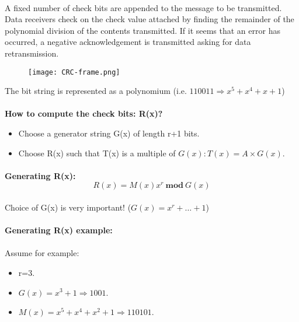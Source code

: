 \documentclass[../resumosRCOM.tex]{subfiles}
\begin{document}
\paragraph{}
A fixed number of check bits are appended to the message to be transmitted. 
Data receivers check on the check value attached by finding the remainder of the 
polynomial division of the contents transmitted. If it seems that an error has 
occurred, a negative acknowledgement is transmitted asking for data retransmission.

\begin{figure}[H]
    \centering
    \texttt{[image: CRC-frame.png]}
\end{figure}

The bit string is represented as a polynomium (i.e. $110011 \Rightarrow x^5+x^4+x
+1$)

\paragraph{}
\textbf{How to compute the check bits: R(x)?}
\begin{itemize}
    \item Choose a generator string G(x) of length r+1 bits.
    \item Choose R(x) such that T(x) is a multiple of $G(x): T(x)=A\times G(x)$.
\end{itemize}

\paragraph{}
\textbf{Generating R(x):}
\begin{equation}
R(x) = {M(x)x^r}\ \textbf{mod}\ {G(x)}
\end{equation}

\paragraph{}
Choice of G(x) is very important! ($G(x)=x^r+…+1$)

\paragraph{}
\textbf{Generating R(x) example:}
\paragraph{}
Assume for example:
\begin{itemize}
    \item r=3.
    \item $G(x)=x^3 + 1 \Rightarrow 1001$.
    \item $M(x)=x^5+x^4+x^2+1 \Rightarrow 110101$.
\end{itemize}
\end{document}
